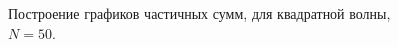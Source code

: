 \documentclass[a5paper, 10pt]{article}
\theoremstyle{definition}
\theoremstyle{plain}
\theoremstyle{remark}
\begin{document}
\begin{figure}[h]
\begin{minipage}[h]{0.5\linewidth}
\end{minipage}
\hfill
\begin{minipage}[h]{0.5\linewidth}
\end{minipage}
\caption{Построение графиков частичных сумм, для квадратной волны, $N=50$.}
\end{figure}
\end{document}
